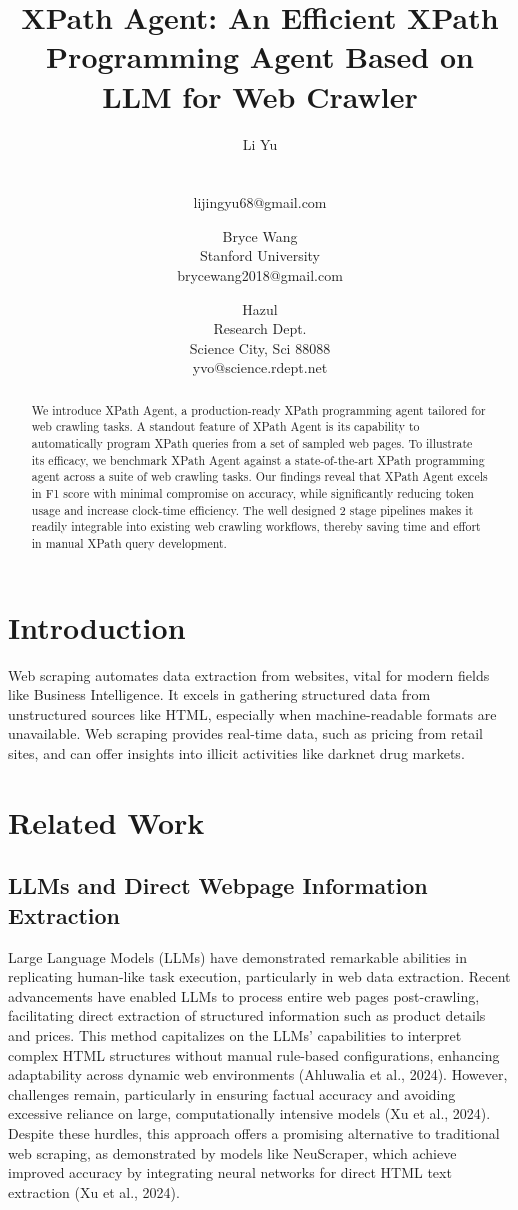 \documentclass[a4paper]{article}
\title{XPath Agent: An Efficient XPath Programming Agent Based on LLM for Web Crawler}
\author{
Li Yu \\ \\ \\ lijingyu68@gmail.com
\and
Bryce Wang \\ Stanford University  \\ brycewang2018@gmail.com
\and
Hazul \\ Research Dept.\\
                Science City, Sci 88088 \\ yvo@science.rdept.net
}
\begin{document}
\maketitle

\begin{abstract}
We introduce XPath Agent, a production-ready XPath programming agent tailored for web crawling tasks. A standout feature of XPath Agent is its capability to automatically program XPath queries from a set of sampled web pages. To illustrate its efficacy, we benchmark XPath Agent against a state-of-the-art XPath programming agent across a suite of web crawling tasks. Our findings reveal that XPath Agent excels in F1 score with minimal compromise on accuracy, while significantly reducing token usage and increase clock-time efficiency. The well designed 2 stage pipelines makes it readily integrable into existing web crawling workflows, thereby saving time and effort in manual XPath query development.
\end{abstract}


\section{Introduction}

Web scraping \cite{khder2021web} automates data extraction from websites, vital for modern fields like Business Intelligence. It excels in gathering structured data from unstructured sources like HTML, especially when machine-readable formats are unavailable. Web scraping provides real-time data, such as pricing from retail sites, and can offer insights into illicit activities like darknet drug markets.

\section{Related Work}
\subsection{LLMs and Direct Webpage Information Extraction}
Large Language Models (LLMs) have demonstrated remarkable abilities in replicating human-like task execution, particularly in web data extraction. Recent advancements have enabled LLMs to process entire web pages post-crawling, facilitating direct extraction of structured information such as product details and prices. This method capitalizes on the LLMs' capabilities to interpret complex HTML structures without manual rule-based configurations, enhancing adaptability across dynamic web environments (Ahluwalia et al., 2024). However, challenges remain, particularly in ensuring factual accuracy and avoiding excessive reliance on large, computationally intensive models (Xu et al., 2024). Despite these hurdles, this approach offers a promising alternative to traditional web scraping, as demonstrated by models like NeuScraper, which achieve improved accuracy by integrating neural networks for direct HTML text extraction (Xu et al., 2024).
\end{document}
